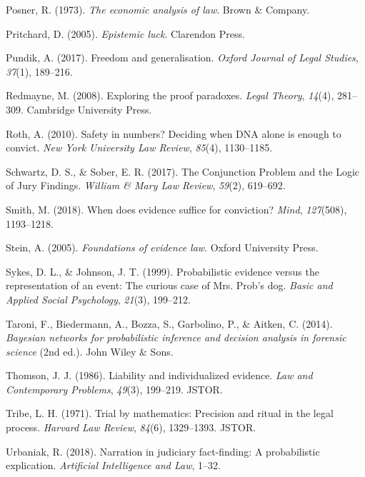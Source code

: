 \documentclass[10pt,dvipsnames,enabledeprecatedfontcommands]{scrartcl}
\begin{document}
\hypertarget{ref-Posner1973}{}
Posner, R. (1973). \emph{The economic analysis of law}. Brown \&
Company.

\hypertarget{ref-pritchard2005epistemic}{}
Pritchard, D. (2005). \emph{Epistemic luck}. Clarendon Press.

\hypertarget{ref-pundik2017}{}
Pundik, A. (2017). Freedom and generalisation. \emph{Oxford Journal of
Legal Studies}, \emph{37}(1), 189--216.

\hypertarget{ref-redmayne2008exploring}{}
Redmayne, M. (2008). Exploring the proof paradoxes. \emph{Legal Theory},
\emph{14}(4), 281--309. Cambridge University Press.

\hypertarget{ref-Roth2010}{}
Roth, A. (2010). Safety in numbers? Deciding when DNA alone is enough to
convict. \emph{New York University Law Review}, \emph{85}(4),
1130--1185.

\hypertarget{ref-schwartz2017ConjunctionProblemLogic}{}
Schwartz, D. S., \& Sober, E. R. (2017). The Conjunction Problem and the
Logic of Jury Findings. \emph{William \& Mary Law Review}, \emph{59}(2),
619--692.

\hypertarget{ref-smith2017}{}
Smith, M. (2018). When does evidence suffice for conviction?
\emph{Mind}, \emph{127}(508), 1193--1218.

\hypertarget{ref-Stein05}{}
Stein, A. (2005). \emph{Foundations of evidence law}. Oxford University
Press.

\hypertarget{ref-sykes1999}{}
Sykes, D. L., \& Johnson, J. T. (1999). Probabilistic evidence versus
the representation of an event: The curious case of Mrs. Prob's dog.
\emph{Basic and Applied Social Psychology}, \emph{21}(3), 199--212.

\hypertarget{ref-taroni2006bayesian}{}
Taroni, F., Biedermann, A., Bozza, S., Garbolino, P., \& Aitken, C.
(2014). \emph{Bayesian networks for probabilistic inference and decision
analysis in forensic science} (2nd ed.). John Wiley \& Sons.

\hypertarget{ref-thomson1986liability}{}
Thomson, J. J. (1986). Liability and individualized evidence. \emph{Law
and Contemporary Problems}, \emph{49}(3), 199--219. JSTOR.

\hypertarget{ref-tribe1971trial}{}
Tribe, L. H. (1971). Trial by mathematics: Precision and ritual in the
legal process. \emph{Harvard Law Review}, \emph{84}(6), 1329--1393.
JSTOR.

\hypertarget{ref-urbaniak2018narration}{}
Urbaniak, R. (2018). Narration in judiciary fact-finding: A
probabilistic explication. \emph{Artificial Intelligence and Law},
1--32.
\end{document}
